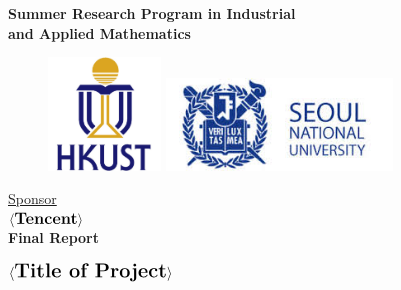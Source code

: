\thispagestyle{empty}

\def\shiftdowna{0.32in}  %
\def\shiftdownb{0.22in}  %


\begin{center}
\textbf{{\large Summer Research Program in Industrial \\ and Applied Mathematics}}\\

\vspace \shiftdowna

\begin{figure}[h]
  \centering
  \begin{minipage}[b]{0.4\textwidth}
    \centering
    \includegraphics[width=3cm]{Graphics/HKUST_logo.jpg}
      \end{minipage}
  \begin{minipage}[b]{0.4\textwidth}
    \centering
    \includegraphics[width=6cm]{Graphics/snu_logo.jpg}
      \end{minipage}
\end{figure}

\vspace \shiftdowna
\underline {Sponsor}\\ 
\vspace{5pt}
$\langle \textbf{{\large Tencent}} \rangle$ \\
\vspace \shiftdowna
\textbf{Final Report}

\vspace \shiftdowna
$\langle \textbf{{\Large Title of Project}}\rangle$



\end{center}
